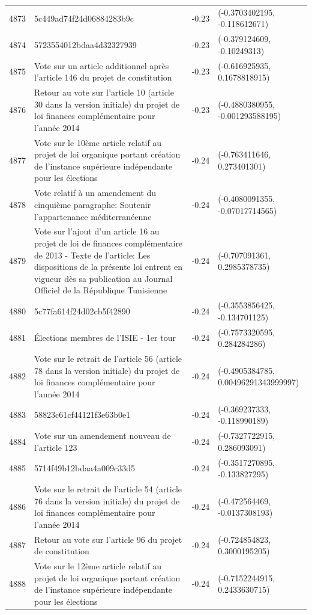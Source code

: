 \begin{table}[ht]
\begin{tabular}{rlrl}
  4873 & 5c449ad74f24d06884283b9c & -0.23 & (-0.3703402195, -0.118612671) \\ 
  4874 & 5723554012bdaa4d32327939 & -0.23 & (-0.379124609, -0.10249313) \\ 
  4875 & Vote sur un article additionnel après l'article 146 du projet de constitution & -0.23 & (-0.616925935, 0.1678818915) \\ 
  4876 & Retour au vote sur l'article 10 (article 30 dans la version initiale) du projet de loi finances complémentaire pour l'année 2014 & -0.23 & (-0.4880380955, -0.001293588195) \\ 
  4877 & Vote sur le 10ème article relatif au projet de loi organique portant création de l'instance supérieure indépendante pour les élections & -0.24 & (-0.763411646, 0.273401301) \\ 
  4878 & Vote relatif à un amendement du cinquième paragraphe: Soutenir l'appartenance méditerranéenne & -0.24 & (-0.4080091355, -0.07017714565) \\ 
  4879 & Vote sur l'ajout d'un article 16 au projet de loi de finances complémentaire de 2013 - Texte de l'article: Les dispositions de la présente loi entrent en vigueur dès sa publication au Journal Officiel de la République Tunisienne & -0.24 & (-0.707091361, 0.2985378735) \\ 
  4880 & 5c77fa614f24d02cb5f42890 & -0.24 & (-0.3553856425, -0.134701125) \\ 
  4881 & Élections membres de l'ISIE - 1er tour & -0.24 & (-0.7573320595, 0.284284286) \\ 
  4882 & Vote sur le retrait de l'article 56 (article 78 dans la version initiale) du projet de loi finances complémentaire pour l'année 2014 & -0.24 & (-0.4905384785, 0.00496291343999997) \\ 
  4883 & 58823c61cf44121f3e63b0e1 & -0.24 & (-0.369237333, -0.118990189) \\ 
  4884 & Vote sur un amendement nouveau de l'article 123 & -0.24 & (-0.7327722915, 0.286093091) \\ 
  4885 & 5714f49b12bdaa4a009c33d5 & -0.24 & (-0.3517270895, -0.133827295) \\ 
  4886 & Vote sur le retrait de l'article 54 (article 76 dans la version initiale) du projet de loi finances complémentaire pour l'année 2014 & -0.24 & (-0.472564469, -0.0137308193) \\ 
  4887 & Retour au vote sur l'article 96 du projet de constitution & -0.24 & (-0.724854823, 0.3000195205) \\ 
  4888 & Vote sur le 12ème article relatif au projet de loi organique portant création de l'instance supérieure indépendante pour les élections & -0.24 & (-0.7152244915, 0.2433630715) \\ 

\end{tabular}
\end{table}

